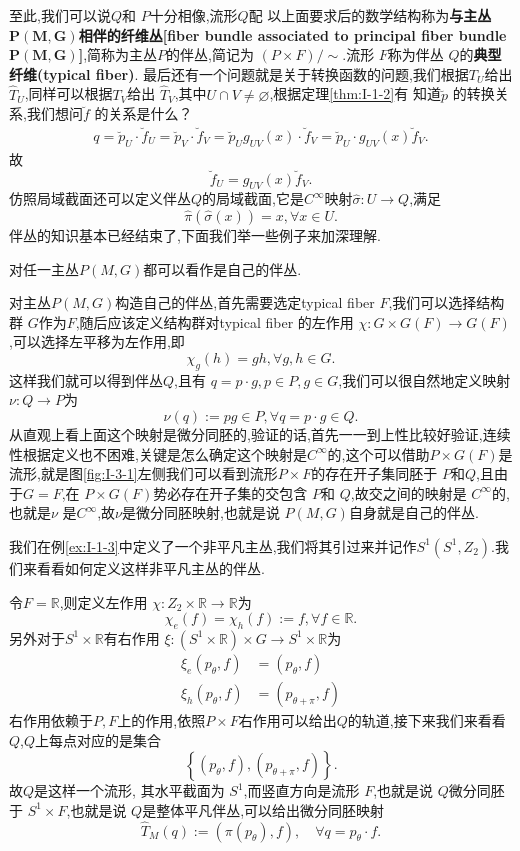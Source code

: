 \documentclass[../main.tex]{subfiles}
\begin{document}
 至此,我们可以说$Q$和 $P$十分相像,流形$Q$配 以上面要求后的数学结构称为\textbf{与主丛$\bm{P(M,G)}$相伴的纤维丛[fiber bundle associated to principal fiber bundle $\bm{P(M,G)}$]},简称为主丛$P$的伴丛,简记为 $(P\times F)/\sim  $.流形 $F$称为伴丛 $Q$的\textbf{典型纤维(typical fiber)}.
 最后还有一个问题就是关于转换函数的问题,我们根据$T_U$给出 $\hat{T}_U$,同样可以根据$T_V$给出 $\hat{T}_V$,其中$U\cap V \neq \varnothing$,根据定理\ref{thm:I-1-2}有 知道$\breve{p}$ 的转换关系,我们想问$\breve{f}$ 的关系是什么？
 \begin{align*}
   q = \breve{p}_U \cdot \breve{f}_U = \breve{p}_V \cdot \breve{f}_V =  \breve{p}_U g_{UV}(x) \cdot \breve{f}_V = \breve{p}_U \cdot g_{UV}(x) \breve{f}_V 
 .\end{align*}
故\[
  \breve{f}_U = g_{UV}(x) \breve{f}_V
.\] 
仿照局域截面还可以定义伴丛$Q$的局域截面,它是$C^\infty$映射$\hat{\sigma}: U\to Q$,满足\[
\hat{\pi}(\hat{\sigma}(x)) = x, \forall x \in U 
.\] 
伴丛的知识基本已经结束了,下面我们举一些例子来加深理解.
\begin{example}
 对任一主丛$P(M,G)$都可以看作是自己的伴丛. 
 \label{ex:I-3-1}
\end{example}
对主丛$P(M,G)$构造自己的伴丛,首先需要选定typical fiber  $F$,我们可以选择结构群 $G$作为$F$,随后应该定义结构群对typical fiber 的左作用 $\chi:G \times G(F) \to G(F)$,可以选择左平移为左作用,即\[
\chi_g(h) = gh, \forall g,h \in G 
.\] 
这样我们就可以得到伴丛$Q$,且有 \(q = p \cdot g, p \in  P, g \in G  \),我们可以很自然地定义映射$\nu : Q \to P$为\[
\nu(q) := pg \in P, \forall q = p\cdot g \in Q 
.\] 
从直观上看上面这个映射是微分同胚的,验证的话,首先一一到上性比较好验证,连续性根据定义也不困难,关键是怎么确定这个映射是$C^\infty$的,这个可以借助$P\times G(F)$是流形,就是图\ref{fig:I-3-1}左侧我们可以看到流形$P\times F$的存在开子集同胚于 $P $和$Q$,且由于$G = F$,在 $P\times G(F)$势必存在开子集的交包含 $P$和 $Q$,故交之间的映射是 $C^\infty$的,也就是$\nu$ 
是$C^\infty$,故$\nu$是微分同胚映射,也就是说 $P(M,G)$自身就是自己的伴丛.
\begin{example}
  \label{ex:I-3-2}
  我们在例\ref{ex:I-1-3}中定义了一个非平凡主丛,我们将其引过来并记作$S^1(S^1,Z_2)$.我们来看看如何定义这样非平凡主丛的伴丛.
\end{example}
令$F = \mathbb{R}$,则定义左作用 $\chi: Z_2 \times \mathbb{R} \to \mathbb{R}$为\[
  \chi_e(f) = \chi_h(f) := f, \forall f \in \mathbb{R}
.\] 另外对于$S^1 \times \mathbb{R}$有右作用 $\xi:(S^1 \times \mathbb{R}) \times G \to S^1 \times \mathbb{R}$为
\begin{align*}
  \xi_e(p_\theta,f)& = (p_\theta,f)\\
  \xi_h(p_\theta,f)& = (p_{\theta + \pi},f)
\end{align*}
右作用依赖于$P,F$上的作用,依照$P \times F$右作用可以给出$Q$的轨道,接下来我们来看看 $Q$,$Q$上每点对应的是集合 \[
  \left\{ (p_\theta,f),(p_{\theta + \pi},f) \right\} 
.\] 
故$Q$是这样一个流形, 其水平截面为 $S^1$,而竖直方向是流形 $F$,也就是说 $Q$微分同胚于 $S^1 \times F$,也就是说
 $Q$是整体平凡伴丛,可以给出微分同胚映射 \[
 \hat{T}_M(q):= (\pi(p_\theta),f), \quad \forall q = p_\theta\cdot f
 .\] 
\end{document}
